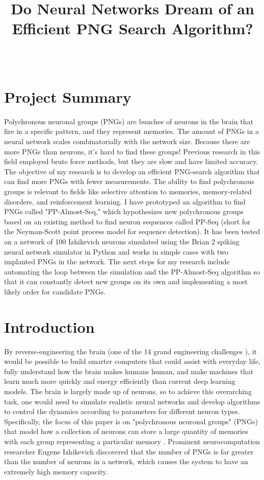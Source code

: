 \documentclass{sigchi}
\def\plaintitle{Do Neural Networks Dream of an Efficient PNG Search Algorithm?}
\begin{document}
\title{\plaintitle}

\author{%
  \\
  }

\maketitle


\section{Project Summary}
Polychronous neuronal groups (PNGs) are bunches of neurons in the brain that fire in a specific pattern, and they represent memories. The amount of PNGs in a neural network scales combinatorially with the network size. Because there are more PNGs than neurons, it's hard to find these groups! Previous research in this field employed brute force methods, but they are slow and have limited accuracy. The objective of my research is to develop an efficient PNG-search algorithm that can find more PNGs with fewer measurements. The ability to find polychronous groups is relevant to fields like selective attention to memories, memory-related disorders, and reinforcement learning. I have prototyped an algorithm to find PNGs called "PP-Almost-Seq," which hypothesizes new polychronous groups based on an existing method to find neuron sequences called PP-Seq (short for the Neyman-Scott point process model for sequence detection). It has been tested on a network of 100 Izhikevich neurons simulated using the Brian 2 spiking neural network simulator in Python and works in simple cases with two implanted PNGs in the network. The next steps for my research include automating the loop between the simulation and the PP-Almost-Seq algorithm so that it can constantly detect new groups on its own and implementing a most likely order for candidate PNGs.
\section{Introduction}
By reverse-engineering the brain (one of the 14 grand engineering challenges \cite{grandchal}), it would be possible to build smarter computers that could assist with everyday life, fully understand how the brain makes humans human, and make machines that learn much more quickly and energy efficiently than current deep learning models. The brain is largely made up of neurons, so to achieve this overarching task, one would need to simulate realistic neural networks and develop algorithms to control the dynamics according to parameters for different neuron types. Specifically, the focus of this paper is on "polychronous neuronal groups" (PNGs) that model how a collection of neurons can store a large quantity of memories with each group representing a particular memory \cite{pngintro}. Prominent neurocomputation researcher Eugene Izhikevich discovered that the number of PNGs is far greater than the number of neurons in a network, which causes the system to have an extremely high memory capacity. 
\end{document}
